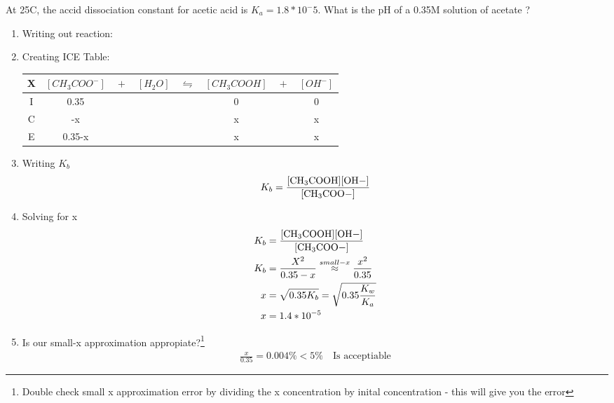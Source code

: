 \documentclass[../CHEM152Notes.tex]{subfiles}
\begin{document}
\begin{exmp}
    At 25C, the accid dissociation constant for acetic acid  is $K_a = 1.8*10^-5$. What is the pH of a 0.35M solution of acetate ?
\end{exmp}
\begin{enumerate}
    \item Writing out reaction:
    \item Creating ICE Table:
    \newline
    \begin{tabular}{c|c@{}c@{}c@{}c@{}c@{}c@{}c}
        \hline
        X   & $[CH_3COO^-]$ & ${}+{}$ & $[H_2O]$ & ${}\leftrightharpoons{}$ & $[CH_3COOH]$ & ${}+{}$ & $[OH^-]$ \\
        \hline
        I   &  0.35   &&     &&  0   && 0  \\
        C   &  -x    &&     &&  x   && x  \\
        E   &  0.35-x &&     &&  x   && x  \\      
    \end{tabular}
    \item Writing $K_b$
        \begin{equation*}
            \begin{aligned}
                K_b = \ce{\frac{[CH3COOH][OH-]}{[CH3COO-]}} 
            \end{aligned}
        \end{equation*}
    \item Solving for x
        \begin{equation*}
            \begin{aligned}
                K_b &= \ce{\frac{[CH3COOH][OH-]}{[CH3COO-]}} \\
                K_b &= \frac{X^2}{0.35-x} \stackrel{small-x}{\approx} \frac{x^2}{0.35} \\
                x &= \sqrt{0.35K_b} = \sqrt{0.35 \frac{K_w}{K_a}} \\
                x &= 1.4*10^{-5}
            \end{aligned}
        \end{equation*}
    \item Is our small-x approximation appropiate?\footnote{Double check small x approximation error by dividing the x concentration by inital concentration - this will give you the error}
        \begin{equation*}
            \begin{aligned}
                \frac{x}{0.35} = 0.004\% < 5\% \quad \text{Is acceptiable}

\end{aligned}
\end{equation*}
\end{enumerate}
\end{document}

